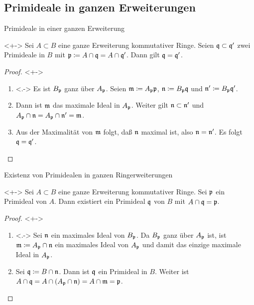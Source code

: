 \subsection{Primideale in ganzen Erweiterungen}

\begin{frame}{Primideale in einer ganzen Erweiterung}
	\begin{corollary}<+->
		\label{cor:equality_of_primes_in_integral_extension}
		Sei \(A \subset B\) eine ganze Erweiterung kommutativer Ringe. Seien
		\(\mathfrak{q} \subset \mathfrak{q}'\) zwei Primideale in \(B\) mit
		\(\mathfrak{p} \coloneqq A \cap \mathfrak{q} = A \cap \mathfrak{q}'\). Dann gilt
		\(\mathfrak{q} = \mathfrak{q}'\).
	\end{corollary}
	\begin{proof}<+->
		\begin{enumerate}[<+->]
		\item<.->
			Es ist \(B_{\mathfrak{p}}\) ganz über \(A_{\mathfrak{p}}\).
			Seien \(\mathfrak{m} \coloneqq A_{\mathfrak{p}} \mathfrak{p}\), \(\mathfrak{n}
			\coloneqq B_{\mathfrak{p}} \mathfrak{q}\) und
			\(\mathfrak{n}' \coloneqq B_{\mathfrak{p}} \mathfrak{q}'\).
		\item
			Dann ist \(\mathfrak{m}\) das maximale Ideal in \(A_{\mathfrak{p}}\).
			Weiter gilt \(\mathfrak{n} \subset \mathfrak{n}'\) und
			\(A_{\mathfrak{p}} \cap \mathfrak{n} = A_{\mathfrak{p}} \cap \mathfrak{n}' =
			\mathfrak{m}\).
		\item
			Aus der Maximalität von \(\mathfrak{m}\) folgt, daß \(\mathfrak{n}\)
			maximal ist, also \(\mathfrak{n} = \mathfrak{n}'\). Es folgt
			\(\mathfrak{q} = \mathfrak{q}'\).
			\qedhere
		\end{enumerate}
	\end{proof}
\end{frame}

\begin{frame}{Existenz von Primidealen in ganzen Ringerweiterungen}
	\begin{theorem}<+->
		\label{thm:existence_of_primes_in_integral_extensions}
		Sei \(A \subset B\) eine ganze Erweiterung kommutativer Ringe.
		Sei \(\mathfrak{p}\) ein Primideal von \(A\). Dann existiert ein
		Primideal \(\mathfrak{q}\) von \(B\) mit \(A \cap \mathfrak{q} = \mathfrak{p}\).
	\end{theorem}
	\begin{proof}<+->
		\begin{enumerate}[<+->]
		\item<.->
			Sei \(\mathfrak{n}\) ein maximales Ideal von \(B_{\mathfrak{p}}\). Da
			\(B_{\mathfrak{p}}\) ganz über \(A_{\mathfrak{p}}\) ist, ist
			\(\mathfrak{m} \coloneqq A_{\mathfrak{p}} \cap \mathfrak{n}\) ein maximales
			Ideal von \(A_{\mathfrak{p}}\) und damit das einzige maximale Ideal
			in \(A_{\mathfrak{p}}\).
		\item
			Sei \(\mathfrak{q} \coloneqq B \cap \mathfrak{n}\). Dann ist \(\mathfrak{q}\)
			ein Primideal in \(B\). Weiter ist
			\(A \cap \mathfrak{q} = A \cap (A_{\mathfrak{p}} \cap \mathfrak{n})
			= A \cap \mathfrak{m} = \mathfrak{p}\).
			\qedhere
		\end{enumerate}
	\end{proof}
\end{frame}

